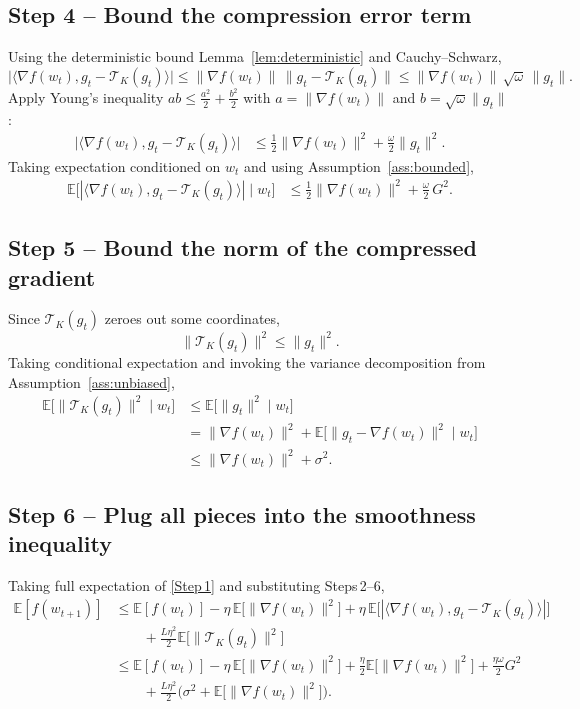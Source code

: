 \documentclass{article}
\newcommand{\TopK}{\mathcal{T}_K}
\newcommand{\E}{\mathbb{E}}
\begin{document}
\subsection*{Step 4 – Bound the compression error term}
Using the deterministic bound Lemma~\ref{lem:deterministic} and Cauchy–Schwarz,
\[
\big|\langle\nabla f(w_t),g_t-\TopK(g_t)\rangle\big|
\le \|\nabla f(w_t)\|\,\|g_t-\TopK(g_t)\|
\le \|\nabla f(w_t)\|\,\sqrt{\omega}\,\|g_t\|.
\]
Apply Young’s inequality $ab\le\frac{a^{2}}{2}+\frac{b^{2}}{2}$ with $a=\|\nabla f(w_t)\|$ and $b=\sqrt{\omega}\|g_t\|$:
\begin{align}
\big|\langle\nabla f(w_t),g_t-\TopK(g_t)\rangle\big|
&\le \frac{1}{2}\|\nabla f(w_t)\|^{2}
   +\frac{\omega}{2}\|g_t\|^{2}.
\tag{Step 4}
\end{align}
Taking expectation conditioned on $w_t$ and using Assumption~\ref{ass:bounded},
\begin{align}
\E\!\big[|\langle\nabla f(w_t),g_t-\TopK(g_t)\rangle|\mid w_t\big]
&\le \frac{1}{2}\|\nabla f(w_t)\|^{2}
   +\frac{\omega}{2}\,G^{2}.
\tag{Step 5}
\end{align}

\subsection*{Step 5 – Bound the norm of the compressed gradient}
Since $\TopK(g_t)$ zeroes out some coordinates,
\[
\|\TopK(g_t)\|^{2}\le\|g_t\|^{2}.
\]
Taking conditional expectation and invoking the variance decomposition from Assumption~\ref{ass:unbiased},
\begin{align}
\E\!\big[\|\TopK(g_t)\|^{2}\mid w_t\big]
&\le \E\!\big[\|g_t\|^{2}\mid w_t\big] \nonumber\\
&= \|\nabla f(w_t)\|^{2}
   +\E\!\big[\|g_t-\nabla f(w_t)\|^{2}\mid w_t\big] \nonumber\\
&\le \|\nabla f(w_t)\|^{2}+\sigma^{2}.
\tag{Step 6}
\end{align}

\subsection*{Step 6 – Plug all pieces into the smoothness inequality}
Taking full expectation of \eqref{Step 1} and substituting Steps 2–6,
\begin{align}
\E[f(w_{t+1})]
&\le \E[f(w_t)]
   -\eta\,\E\!\big[\|\nabla f(w_t)\|^{2}\big]
   +\eta\,\E\!\big[|\langle\nabla f(w_t),g_t-\TopK(g_t)\rangle|\big] \nonumber\\
&\qquad +\frac{L\eta^{2}}{2}\E\!\big[\|\TopK(g_t)\|^{2}\big] \nonumber\\[4pt]
&\le \E[f(w_t)]
   -\eta\,\E\!\big[\|\nabla f(w_t)\|^{2}\big]
   +\frac{\eta}{2}\E\!\big[\|\nabla f(w_t)\|^{2}\big]
   +\frac{\eta\omega}{2}G^{2} \nonumber\\
&\qquad +\frac{L\eta^{2}}{2}\Big(\sigma^{2}
   +\E\!\big[\|\nabla f(w_t)\|^{2}\big]\Big).
\tag{Step 7}
\end{align}
\end{document}
